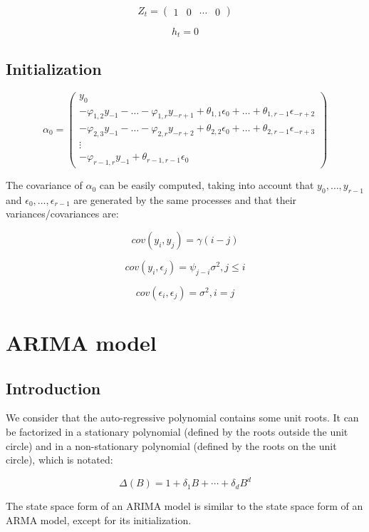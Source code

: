 \documentclass[
  letterpaper,
  DIV=11,
  numbers=noendperiod]{scrreprt}
\begin{document}
\[ Z_t = \begin{pmatrix} 1 & 0 & \cdots & 0\end{pmatrix}\]

\[ h_t = 0 \]

\subsection{Initialization}\label{initialization-2}

\[ \alpha_0= \begin{pmatrix} y_0 \\ 
-\varphi_{1,2} y_{-1}-\dots-\varphi_{1,r} y_{-r+1}+\theta_{1,1} \epsilon_0+ \dots + \theta_{1, r-1} \epsilon_{-r+2}\\ -\varphi_{2,3} y_{-1}-\dots-\varphi_{2,r} y_{-r+2}+\theta_{2,2 }\epsilon_0+ \dots + \theta_{2,r-1} \epsilon_{-r+3}\\ \vdots \\ 
-\varphi_{r-1,r} y_{-1}+\theta_{r-1,r-1} \epsilon_{0}
\end{pmatrix}\]

The covariance of \(\alpha_0\) can be easily computed, taking into
account that \(y_0, \dots,y_{r-1}\) and
\(\epsilon_0, \dots, \epsilon_{r-1}\) are generated by the same
processes and that their variances/covariances are:

\[ cov(y_i, y_j)=\gamma(i-j)\]

\[ cov(y_i, \epsilon_j) = \psi_{j-i}\sigma^2, j\le i\]

\[ cov(\epsilon_i, \epsilon_j)=\sigma^2, i=j \]

\section{ARIMA model}\label{arima-model}

\subsection{Introduction}\label{introduction-3}

We consider that the auto-regressive polynomial contains some unit
roots. It can be factorized in a stationary polynomial (defined by the
roots outside the unit circle) and in a non-stationary polynomial
(defined by the roots on the unit circle), which is notated:

\[ \Delta\left(B\right) = 1 + \delta_1 B + \cdots + \delta_d B^d \]

The state space form of an ARIMA model is similar to the state space
form of an ARMA model, except for its initialization.
\end{document}
